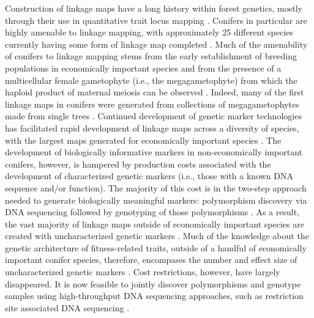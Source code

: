 \documentclass[smallextended]{svjour3}
\begin{document}
Construction of linkage maps have a long history within forest genetics, mostly through their use in quantitative trait locus 
mapping \citep{Ritland:2011}. Conifers in particular are highly amenable to linkage mapping, with approximately 25 different 
species currently having some form of linkage map completed \citep[see Table 5-1 in][]{Ritland:2011}. Much of the amenability of 
conifers to linkage mapping stems from the early establishment of breeding populations in economically important species and from 
the presence of a multicellular female gametophyte (i.e., the megagametophyte) from which the haploid product of maternal meiosis 
can be observed \citep{Cairney:2007}. Indeed, many of the first linkage maps in conifers were generated from collections of 
megagametophytes made from single trees \citep{Tulsieram:1992, Nelson:1993, Kubisiak:1996}. Continued development 
of genetic marker technologies has facilitated rapid development of linkage maps across a diversity of species, with the largest maps 
generated for economically important species \citep[e.g.][] {Achere:2004, Kang:2010, Martinez-Garcia:2013}. 
The development of biologically informative markers in non-economically important conifers, however, is hampered by production costs 
associated with the development of characterized  genetic markers (i.e., those with a known DNA sequence and/or function). 
The majority of this cost is in the two-step approach needed to generate biologically 
meaningful markers: polymorphism discovery via DNA sequencing followed by genotyping of those polymorphisms 
\citep[cf.][]{Eckert:2013a}. As a result, the vast majority of linkage maps outside of economically important 
species are created with uncharacterized genetic markers \citep[e.g.,][]{Travis:1998}. Much of the knowledge about the genetic 
architecture of fitness-related traits, outside of a handful of economically important conifer species, therefore, encompases  the 
number and effect size of uncharacterized genetic markers \citep{Ritland:2011}. Cost restrictions, however, have largely disappeared. 
It is now feasible to jointly discover polymorphisms and genotype samples using high-throughput DNA sequencing 
approaches, such as restriction site associated DNA sequencing \citep [RADseq; e.g.,][] {Peterson:2012}. 
\end{document}
